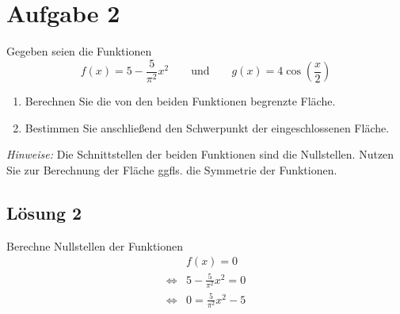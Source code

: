 \documentclass[main.tex]{subfiles}
\begin{document}
\section{Aufgabe 2}
Gegeben seien die Funktionen 
\[
    f(x) = 5 - \frac{5}{\pi^2} x^2 
    \qquad \mbox{und} \qquad 
    g(x) = 4 \cos \left( \frac{x}{2} \right)
\]
\begin{enumerate}
\item Berechnen Sie die von den beiden Funktionen begrenzte Fläche.
\item Bestimmen Sie anschließend den Schwerpunkt der eingeschlossenen Fläche.
\end{enumerate}
\textit{Hinweise:} Die Schnittstellen der beiden Funktionen sind die Nullstellen. Nutzen Sie zur Berechnung der Fläche ggfls. die Symmetrie der Funktionen. 

\subsection{Lösung 2}

Berechne Nullstellen der Funktionen
\begin{align*}
                     & f(x) = 0\\
    \Leftrightarrow  & 5 - \frac{5}{\pi^2} x^2 = 0 \\
    \Leftrightarrow  & 0 = \frac{5}{\pi^2} x^2 -5 \\
\end{align*}
\end{document}
